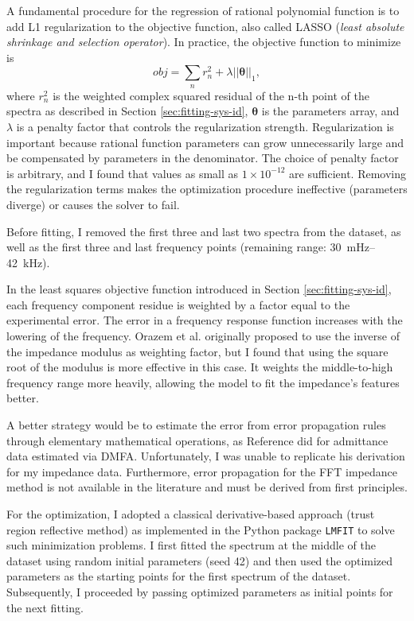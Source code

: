 A fundamental procedure for the regression of rational polynomial function is to add L1 regularization to the objective function, also called LASSO (\emph{least absolute shrinkage and selection operator}).
In practice, the objective function to minimize is
\begin{equation}
  obj = \sum_n r_n^2 + \lambda ||\mathbf{\theta}||_1,
\end{equation}
where $r_n^2$ is the weighted complex squared residual of the n-th point of the spectra as described in Section \ref{sec:fitting-sys-id}, $\mathbf{\theta}$ is the parameters array, and $\lambda$ is a penalty factor that controls the regularization strength.
Regularization is important because rational function parameters can grow unnecessarily large and be compensated by parameters in the denominator.
The choice of penalty factor is arbitrary, and I found that values as small as $1 \times 10^{-12}$ are sufficient.
Removing the regularization terms makes the optimization procedure ineffective (parameters diverge) or causes the solver to fail.


Before fitting, I removed the first three and last two spectra from the dataset, as well as the first three and last frequency points (remaining range: 30~mHz--42~kHz).

In the least squares objective function introduced in Section \ref{sec:fitting-sys-id}, each frequency component residue is weighted by a factor equal to the experimental error.
The error in a frequency response function increases with the lowering of the frequency.
Orazem et al.\cite{orazemEIS} originally proposed to use the inverse of the impedance modulus as weighting factor, but I found that using the square root of the modulus is more effective in this case. It weights the middle-to-high frequency range more heavily, allowing the model to fit the impedance's features better.

A better strategy would be to estimate the error from error propagation rules through elementary mathematical operations, as Reference \cite{chukwuStatisticalAnalysisMeasurement2022} did for admittance data estimated via DMFA.
Unfortunately, I was unable to replicate his derivation for my impedance data.
Furthermore, error propagation for the FFT impedance method is not available in the literature and must be derived from first principles.

For the optimization, I adopted a classical derivative-based approach (trust region reflective method) as implemented in the Python package \verb|LMFIT| \cite{newville_2014_11813} to solve such minimization problems.
I first fitted the spectrum at the middle of the dataset using random initial parameters (seed 42) and then used the optimized parameters as the starting points for the first spectrum of the dataset. Subsequently, I proceeded by passing optimized parameters as initial points for the next fitting.

